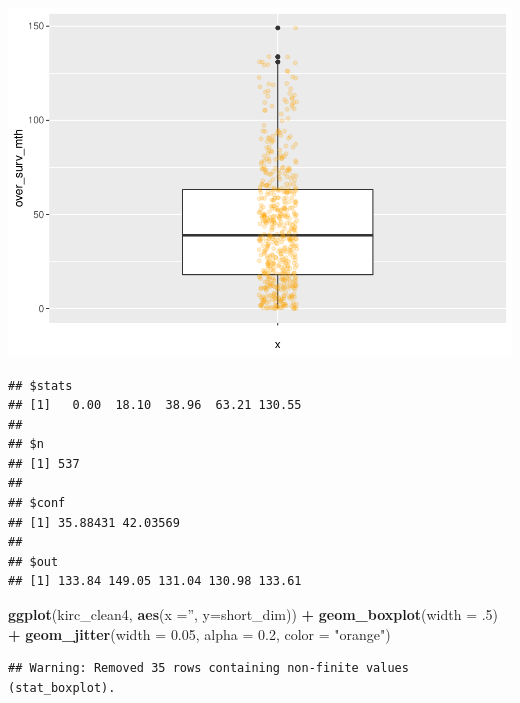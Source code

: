 \documentclass[]{article}
\newenvironment{Shaded}{\begin{snugshade}}{\end{snugshade}}
\newcommand{\KeywordTok}[1]{\textcolor[rgb]{0.13,0.29,0.53}{\textbf{#1}}}
\newcommand{\DataTypeTok}[1]{\textcolor[rgb]{0.13,0.29,0.53}{#1}}
\newcommand{\DecValTok}[1]{\textcolor[rgb]{0.00,0.00,0.81}{#1}}
\newcommand{\FloatTok}[1]{\textcolor[rgb]{0.00,0.00,0.81}{#1}}
\newcommand{\StringTok}[1]{\textcolor[rgb]{0.31,0.60,0.02}{#1}}
\newcommand{\OperatorTok}[1]{\textcolor[rgb]{0.81,0.36,0.00}{\textbf{#1}}}
\newcommand{\NormalTok}[1]{#1}
\begin{document}
\includegraphics{figs/render-unnamed-chunk-24-1.pdf}

\begin{Shaded}
\end{Shaded}

\begin{verbatim}
## $stats
## [1]   0.00  18.10  38.96  63.21 130.55
## 
## $n
## [1] 537
## 
## $conf
## [1] 35.88431 42.03569
## 
## $out
## [1] 133.84 149.05 131.04 130.98 133.61
\end{verbatim}

\begin{Shaded}
\begin{Highlighting}[]
\KeywordTok{ggplot}\NormalTok{(kirc_clean4, }\KeywordTok{aes}\NormalTok{(}\DataTypeTok{x =}\StringTok{''}\NormalTok{, }\DataTypeTok{y=}\NormalTok{short_dim)) }\OperatorTok{+}
\StringTok{     }\KeywordTok{geom_boxplot}\NormalTok{(}\DataTypeTok{width =}\NormalTok{ .}\DecValTok{5}\NormalTok{) }\OperatorTok{+}
\StringTok{     }\KeywordTok{geom_jitter}\NormalTok{(}\DataTypeTok{width =} \FloatTok{0.05}\NormalTok{, }\DataTypeTok{alpha =} \FloatTok{0.2}\NormalTok{, }\DataTypeTok{color =} \StringTok{"orange"}\NormalTok{)}
\end{Highlighting}
\end{Shaded}

\begin{verbatim}
## Warning: Removed 35 rows containing non-finite values (stat_boxplot).
\end{verbatim}
\end{document}
